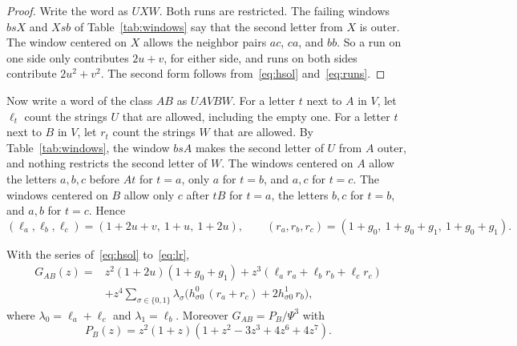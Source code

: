 \begin{proof}
Write the word as $UXW$. Both runs are restricted. The failing windows $bsX$
and $Xsb$ of Table~\ref{tab:windows} say that the second letter from $X$ is
outer. The window centered on $X$ allows the neighbor pairs $ac$, $ca$, and
$bb$. So a run on one side only contributes $2u+v$, for either side, and
runs on both sides contribute $2u^2+v^2$. The second form follows
from~\eqref{eq:hsol} and~\eqref{eq:runs}.
\end{proof}

Now write a word of the class $AB$ as $UAVBW$. For a letter $t$ next to $A$ in
$V$, let $\ell_t$ count the strings $U$ that are allowed, including the empty
one. For a letter $t$ next to $B$ in $V$, let $r_t$ count the strings $W$ that
are allowed. By Table~\ref{tab:windows}, the window $bsA$ makes the second
letter of $U$ from $A$ outer, and nothing restricts the second letter of
$W$. The windows centered on $A$ allow the letters $a,b,c$ before $At$ for
$t=a$, only $a$ for $t=b$, and $a,c$ for $t=c$. The windows centered on $B$
allow only $c$ after $tB$ for $t=a$, the letters $b,c$ for $t=b$, and $a,b$
for $t=c$. Hence
\begin{equation}\label{eq:lr}
(\ell_a,\ell_b,\ell_c)=(1+2u+v,\ 1+u,\ 1+2u),\qquad
(r_a,r_b,r_c)=(1+g_0,\ 1+g_0+g_1,\ 1+g_0+g_1).
\end{equation}

\begin{proposition}\label{prop:GAB}
With the series of~\eqref{eq:hsol} to~\eqref{eq:lr},
\begin{equation}\label{eq:GAB}
\begin{aligned}
G_{AB}(z)={}&z^2(1+2u)(1+g_0+g_1)+z^3(\ell_ar_a+\ell_br_b+\ell_cr_c)\\
&+z^4\sum_{\sigma\in\{0,1\}}\lambda_\sigma\bigl(h^0_{\sigma0}\,(r_a+r_c)+2h^1_{\sigma0}\,r_b\bigr),
\end{aligned}
\end{equation}
where $\lambda_0=\ell_a+\ell_c$ and $\lambda_1=\ell_b$. Moreover $G_{AB}=P_B/\Psi^3$
with
\begin{equation}\label{eq:PB}
P_B(z)=z^2(1+z)(1+z^2-3z^3+4z^6+4z^7).
\end{equation}
\end{proposition}

